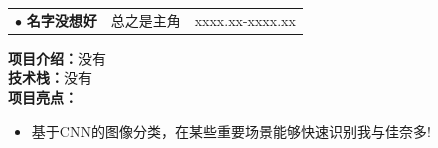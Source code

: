\documentclass{cv}
\begin{document}
\vspace{5pt}
\noindent
 \begin{tabularx}{\textwidth}{XXX}
  $\bullet$ \textbf{名字没想好} &总之是主角  & xxxx.xx-xxxx.xx
 \end{tabularx}
 \textbf{项目介绍：}没有\\
 \textbf{技术栈：}没有\\
 \textbf{项目亮点：}
\begin{itemize}[topsep=0pt,itemsep=0.8pt]
   \item 基于CNN的图像分类，在某些重要场景能够快速识别我与佳奈多!
   
   \end{itemize}
\end{document}
